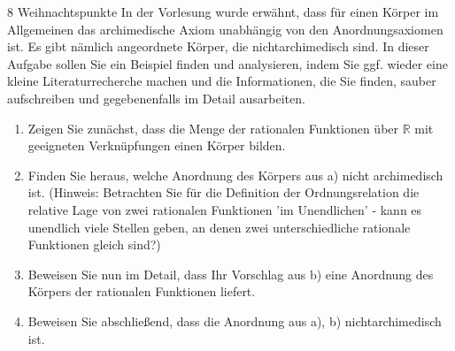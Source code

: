 \documentclass{../problemset}
\begin{document}
\begin{problem}{8 Weihnachtspunkte}
In der Vorlesung wurde erwähnt, dass für einen Körper im Allgemeinen das archimedische Axiom unabhängig von den Anordnungsaxiomen ist. Es gibt nämlich angeordnete Körper, die nichtarchimedisch sind. In dieser Aufgabe sollen Sie ein Beispiel finden und analysieren, indem Sie ggf. wieder eine kleine Literaturrecherche machen und die Informationen, die Sie finden, sauber aufschreiben und gegebenenfalls im Detail ausarbeiten.
\begin{enumerate}
	\item Zeigen Sie zunächst, dass die Menge der rationalen Funktionen über $\mathbb{R}$ mit geeigneten Verknüpfungen einen Körper bilden.
	\item Finden Sie heraus, welche Anordnung des Körpers aus a) nicht archimedisch ist. (Hinweis: Betrachten Sie für die Definition der Ordnungsrelation die relative Lage von zwei rationalen Funktionen 'im Unendlichen' - kann es unendlich viele Stellen geben, an denen zwei unterschiedliche rationale Funktionen gleich sind?)
	\item Beweisen Sie nun im Detail, dass Ihr Vorschlag aus b) eine Anordnung des Körpers der rationalen Funktionen liefert.
	\item Beweisen Sie abschließend, dass die Anordnung aus a), b) nichtarchimedisch ist.
\end{enumerate}
\end{problem}
\end{document}

